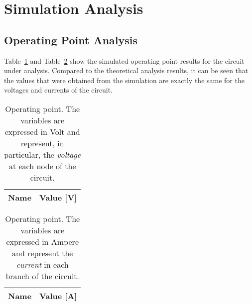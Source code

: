 \section{Simulation Analysis}
\label{sec:simulation}

\subsection{Operating Point Analysis}

Table~\ref{tab:vngspice} and Table~\ref{tab:cngspice}  show the simulated operating point results for the circuit
under analysis. Compared to the theoretical analysis results, it can be seen that the values that were obtained from the simulation are exactly the same for the voltages and currents of the circuit.

\begin{table}[h]
  \centering
  \begin{tabular}{|l|r|}
    \hline    
    {\bf Name} & {\bf Value [V]} \\ \hline
    
  \end{tabular}
  \caption{Operating point. The variables are  expressed in Volt and represent, in particular, the {\it voltage} at each node of the circuit.}
  \label{tab:vngspice}
\end{table}

\begin{table}[h]
  \centering
  \begin{tabular}{|l|r|}
    \hline    
    {\bf Name} & {\bf Value [A]} \\ \hline
    
  \end{tabular}
  \caption{Operating point. The variables are expressed in Ampere and represent the {\em current} in each branch of the circuit.}
  \label{tab:cngspice}
\end{table}




